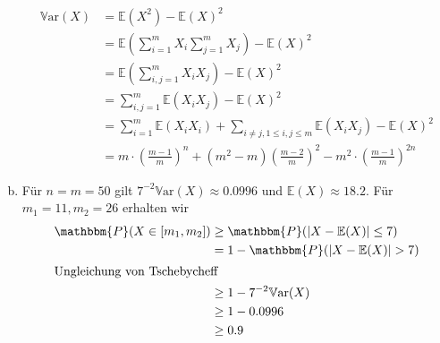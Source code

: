 \documentclass[uebung]{lecture}
\newcommand{\E}{\mathbb{E}}
\renewcommand{\P}{\mathbbm{P}}
\newcommand{\var}{\mathbb{V}\text{ar}}
\begin{document}
\begin{aufgabe}
\begin{enumerate}[(a)]
\begin{align*}
            \var(X) &= \E(X^2) - \E(X)^2\\
            &= \E\left(\sum_{i = 1}^{m} X_i \sum_{j = 1}^{m} X_j\right)- \E(X)^2\\
            &= \E\left(\sum_{i, j = 1}^m X_iX_j\right)- \E(X)^2\\
            &= \sum_{i,j = 1}^{m} \E(X_iX_j)- \E(X)^2\\
            &= \sum_{i = 1}^{m} \E(X_iX_i) + \sum_{i \neq j, 1\leq i, j \leq m} \E(X_iX_j)- \E(X)^2\\
            &= m \cdot \left(\frac{m-1}{m}\right)^n + (m^2 - m) \left(\frac{m-2}{m}\right)^2 - m^2 \cdot \left(\frac{m-1}{m}\right)^{2n}
        \end{align*}
        \item Für $n = m = 50$ gilt $7^{-2}\var(X) \approx 0.0996$ und $\E(X) \approx 18.2$. Für $m_1 = 11, m_2 = 26$ erhalten wir
        \begin{align*}
            \P(X \in [m_1, m_2]) &\geq \P(|X - \E(X)| \leq 7)\\
            &= 1 - \P(|X - \E(X)| > 7)\\
            \intertext{Ungleichung von Tschebycheff}
            &\geq 1 - 7^{-2}\var(X)\\
            &\geq 1 - 0.0996\\
            &\geq 0.9
        \end{align*}
    \end{enumerate}
\end{aufgabe}
\end{document}
